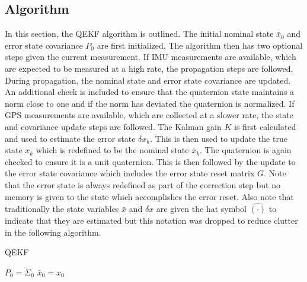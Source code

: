 \subsection{Algorithm}
In this section, the QEKF algorithm is outlined. The initial nominal state $\bar{x}_0$ and error state covariance $P_0$ are first initialized. The algorithm then has two optional steps given the current measurement. If IMU measurements are available, which are expected to be measured at a high rate, the propagation steps are followed. During propagation, the nominal state and error state covariance are updated. An additional check is included to ensure that the quaternion state maintains a norm close to one and if the norm has deviated the quaternion is normalized. If GPS measurements are available, which are collected at a slower rate, the state and covariance update steps are followed. The Kalman gain $K$ is first calculated and used to estimate the error state $\delta x_k$. This is then used to update the true state $x_k$ which is redefined to be the nominal state $\bar{x}_k$. The quaternion is again checked to ensure it is a unit quaternion. This is then followed by the update to the error state covariance which includes the error state reset matrix $G$. Note that the error state is always redefined as part of the correction step but no memory is given to the state which accomplishes the error reset. Also note that traditionally the state variables $\bar{x}$ and $\delta x$ are given the hat symbol $\hat{(\cdot)}$ to indicate that they are estimated but this notation was dropped to reduce clutter in the following algorithm.
\begin{algorithm}
\caption{QEKF}\label{alg: QESKF}
$P_0 = \Sigma_0$\;
$\bar{x}_0 = x_0$\;

\end{algorithm}



